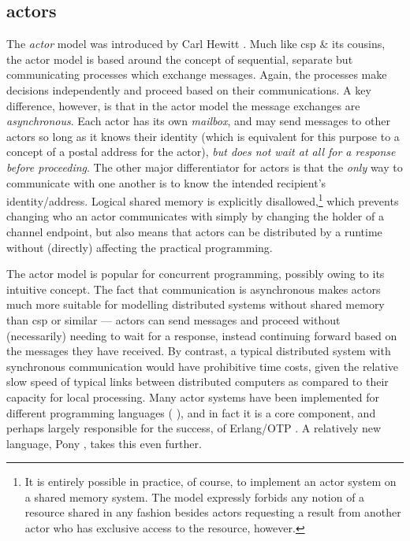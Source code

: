 \subsection{\label{subsec:back:actors}\texorpdfstring{\Glspl{actor}}{Actors}}
The \emph{\gls{actor}} \cite{Agha1986,Agha1997} model was introduced by Carl Hewitt \cite{Hewitt1973}.  Much like \gls{csp} \& its cousins, the \gls{actor} model is based around the concept of sequential, separate but communicating processes which exchange messages.  Again, the processes make decisions independently and proceed based on their communications.  A key difference, however, is that in the \gls{actor} model the message exchanges are \emph{asynchronous}.  Each \gls{actor} has its own \emph{mailbox}, and may send messages to other \glspl{actor} so long as it knows their identity (which is equivalent for this purpose to a concept of a postal address for the \gls{actor}), \emph{but does not wait at all for a response before proceeding}.  The other major differentiator for \glspl{actor} is that the \emph{only} way to communicate with one another is to know the intended recipient's identity/address.  Logical shared memory is explicitly disallowed,\footnote{It is entirely possible in practice, of course, to implement an \gls{actor} system on a shared memory system.  The model expressly forbids any notion of a resource shared in any fashion besides \glspl{actor} requesting a result from another \gls{actor} who has exclusive access to the resource, however.} which prevents changing who an \gls{actor} communicates with simply by \eg{} changing the holder of a channel endpoint, but also means that actors can be distributed by a runtime without (directly) affecting the practical programming.

The \gls{actor} model is popular for concurrent programming, possibly owing to its intuitive concept.  The fact that communication is asynchronous makes \glspl{actor} much more suitable for modelling distributed systems without shared memory than \gls{csp} or similar --- \glspl{actor} can send messages and proceed without (necessarily) needing to wait for a response, instead continuing forward based on the messages they have received.  By contrast, a typical distributed system with synchronous communication would have prohibitive time costs, given the relative slow speed of typical links between distributed computers as compared to their capacity for local processing.  Many \gls{actor} systems have been implemented for different programming languages (\eg{} \cite{Varela2001,Srinivasan2008,Charousset2016,Bernstein2016}), and in fact it is a core component, and perhaps largely responsible for the success, of Erlang/OTP \cite{Armstrong2010,Armstrong2013,Vinoski2012}.  A relatively new language, Pony \cite{Clebsch2015,Clebsch2017}, takes this even further.

